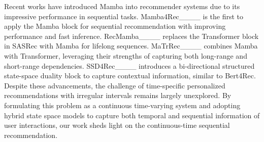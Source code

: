 Recent works have introduced Mamba into recommender systems due to its impressive performance in sequential tasks. Mamba4Rec____ is the first to apply the Mamba block for sequential recommendation with improving performance and fast inference. RecMamba____ replaces the Transformer block in SASRec with Mamba for lifelong sequences. MaTrRec____ combines Mamba with Transformer, leveraging their strengths of capturing both long-range and short-range dependencies. SSD4Rec____ introduces a bi-directional structured state-space duality block to capture contextual information, similar to Bert4Rec.
Despite these advancements, the challenge of time-specific personalized recommendations with irregular intervals remains largely unexplored. By formulating this problem as a continuous time-varying system and adopting hybrid state space models to capture both temporal and sequential information of user interactions, our work sheds light on the continuous-time sequential recommendation.